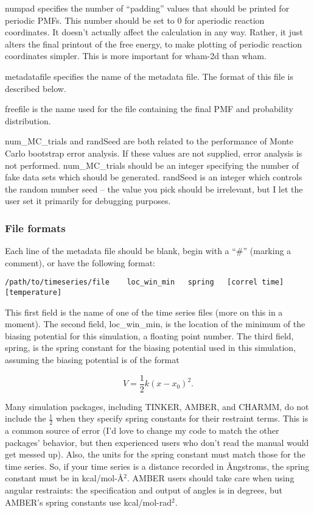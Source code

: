 \documentclass[12pt]{article}
\begin{document}
numpad specifies the number of ``padding'' values that should be printed for
periodic PMFs.  This number should be set to 0 for aperiodic reaction
coordinates.  It doesn't actually affect the calculation in any way.
Rather, it just alters the final printout of the free energy, to make
plotting of periodic reaction coordinates simpler.  This is more important
for wham-2d than wham.

metadatafile specifies the name of the metadata file.  The format of this
file is described below.

freefile is the name used for the file containing the final PMF and
probability distribution.

num\_MC\_trials and randSeed are both related to the performance of Monte
Carlo bootstrap error analysis.  If these values are not supplied, error
analysis is not performed.  num\_MC\_trials should be an integer specifying
the number of fake data sets which should be generated.  randSeed is an
integer which controls the random number seed -- the value you pick should
be irrelevant, but I let the user set it primarily for debugging purposes.

\subsubsection{File formats}
\label{ss:format}

Each line of the metadata file should be blank, begin with a ``\#'' (marking a 
comment), or have the following format:

\begin{footnotesize}
\begin{verbatim}
/path/to/timeseries/file    loc_win_min   spring   [correl time] [temperature]
\end{verbatim}
\end{footnotesize}

This first field is the name of one of the time series files (more on this
in a moment).  The second field, loc\_win\_min, is the location of the
minimum of the biasing potential for this simulation, a floating point
number.  The third field, spring, is the spring constant for the biasing
potential used in this simulation, assuming the biasing potential is of the
format 

\begin{equation}
V = \frac{1}{2} k (x-x_0)^2.  
\end{equation}

Many simulation packages, including TINKER, AMBER, and CHARMM, do not include
the $\frac{1}{2}$ when they specify spring constants for their restraint
terms.  This is a common source of error (I'd love to change my code to match
the other packages' behavior, but then experienced users who don't read the
manual would get messed up).  Also, the units for the spring constant must
match those for the time series.  So, if your time series is a distance
recorded in {\AA}ngstroms, the spring constant must be in kcal/mol-{\AA}$^2$.
AMBER users should take care when using angular restraints: the specification
and output of angles is in degrees, but AMBER's spring constants use
kcal/mol-rad$^2$.
\end{document}
